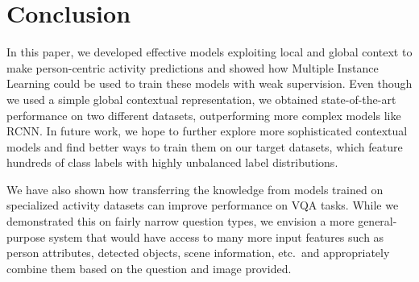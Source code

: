 \documentclass[runningheads]{llncs}
\begin{document}
%
 

\section{Conclusion}
\label{sec:conclusion}

In this paper, we developed effective models exploiting local and global context to make person-centric activity predictions and showed how Multiple Instance Learning could be used to train these models with weak supervision. Even though we used a simple global contextual representation, we obtained state-of-the-art performance on two different datasets, outperforming more complex models like RCNN. In future work, we hope to further explore more sophisticated contextual models and find better ways to train them on our target datasets, which feature hundreds of class labels with highly unbalanced label distributions.

We have also shown how transferring the knowledge from models trained on specialized activity datasets can improve performance on VQA tasks. While we demonstrated this on fairly narrow question types, we envision a more general-purpose system that would have access to many more input features such as person attributes, detected objects, scene information, etc.\ and appropriately combine them based on the question and image provided. 

 


\end{document}
